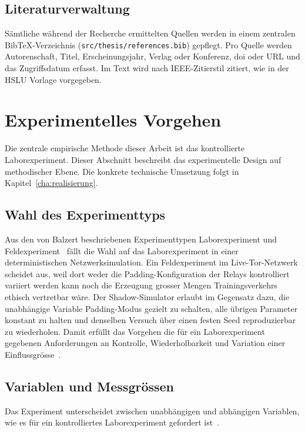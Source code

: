 \subsection{Literaturverwaltung}
\label{sec:literaturrecherche_verwaltung}

Sämtliche während der Recherche ermittelten Quellen werden in einem zentralen BibTeX-Verzeichnis (\texttt{src/thesis/references.bib}) gepflegt.
Pro Quelle werden Autorenschaft, Titel, Erscheinungsjahr, Verlag oder Konferenz, \gls{doi} oder URL und das Zugriffsdatum erfasst.
Im Text wird nach IEEE-Zitierstil zitiert, wie in der HSLU Vorlage vorgegeben.

\section{Experimentelles Vorgehen}
\label{sec:experimentelles_vorgehen}

Die zentrale empirische Methode dieser Arbeit ist das kontrollierte Laborexperiment.
Dieser Abschnitt beschreibt das experimentelle Design auf methodischer Ebene.
Die konkrete technische Umsetzung folgt in Kapitel~\ref{cha:realisierung}.

\subsection{Wahl des Experimenttyps}
\label{sec:experiment_typ}

Aus den von Balzert beschriebenen Experimenttypen Laborexperiment und Feldexperiment~\cite{book} fällt die Wahl auf das Laborexperiment in einer deterministischen Netzwerksimulation.
Ein Feldexperiment im Live-Tor-Netzwerk scheidet aus, weil dort weder die Padding-Konfiguration der Relays kontrolliert variiert werden kann noch die Erzeugung grosser Mengen Trainingsverkehrs ethisch vertretbar wäre.
Der Shadow-Simulator erlaubt im Gegensatz dazu, die unabhängige Variable Padding-Modus gezielt zu schalten, alle übrigen Parameter konstant zu halten und denselben Versuch über einen festen Seed reproduzierbar zu wiederholen.
Damit erfüllt das Vorgehen die für ein Laborexperiment gegebenen Anforderungen an Kontrolle, Wiederholbarkeit und Variation einer Einflussgrösse~\cite{book}.

\subsection{Variablen und Messgrössen}
\label{sec:experiment_variablen}

Das Experiment unterscheidet zwischen unabhängigen und abhängigen Variablen, wie es für ein kontrolliertes Laborexperiment gefordert ist~\cite{book}.

